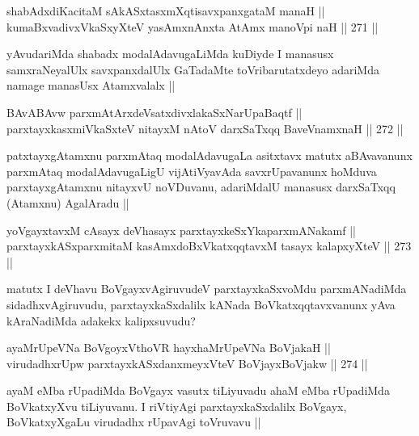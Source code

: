 \begin{shl}
shabAdxdiKacitaM sAkASxtasxmXqtisavxpanxgataM manaH || \\
kumaBxvadivxVkaSxyXteV yasAmxnAnxta AtAmx manoV\s pi naH ||  271 ||  
\end{shl}

\begin{artha}
yAvudariMda shabadx modalAdavugaLiMda kuDiyde I manasusx samxraNeyalUlx savxpanxdalUlx GaTadaMte toVribarutatxdeyo adariMda namage manasUsx Atamxvalalx ||
\end{artha}

\begin{shl}
BAvABAvw parxmAtArxdeVsatxdivxlakaSxNarUpaBaqtf || \\
parxtayxkasxmiVkaSxteV nitayxM nAtoV darxSaTxqq BaveVnamxnaH ||  272 ||  
\end{shl}

\begin{artha}
patxtayxgAtamxnu parxmAtaq modalAdavugaLa asitxtavx matutx aBAvavanunx parxmAtaq modalAdavugaLigU vijAtiVyavAda savxrUpavanunx hoMduva parxtayxgAtamxnu nitayxvU noVDuvanu, adariMdalU manasusx darxSaTxqq (Atamxnu) AgalAradu ||
\end{artha}

\begin{shl}
yoVgayxtavxM cAsayx deVhasayx parxtayxkeSxYkaparxmANakamf || \\
parxtayxkASxparxmitaM kasAmxdoBxVkatxqqtavxM tasayx kalapxyXteV ||  273 ||  
\end{shl}

\begin{artha}
matutx I deVhavu BoVgayxvAgiruvudeV parxtayxkaSxvoMdu parxmANadiMda sidadhxvAgiruvudu, parxtayxkaSxdalilx kANada BoVkatxqqtavxvanunx yAva kAraNadiMda adakekx kalipxsuvudu?
\end{artha}


\begin{shl}
ayaMrUpeVNa BoVgoyxV\s thoVR hayxhaMrUpeVNa BoVjakaH || \\
virudadhxrUpw parxtayxkASxdanxmeyxVteV BoVjayxBoVjakw ||  274 ||  
\end{shl}	

\begin{artha}
ayaM eMba rUpadiMda BoVgayx vasutx tiLiyuvadu ahaM eMba rUpadiMda BoVkatxyXvu tiLiyuvanu. I riVtiyAgi parxtayxkaSxdalilx BoVgayx, BoVkatxyXgaLu virudadhx rUpavAgi toVruvavu ||
\end{artha}


